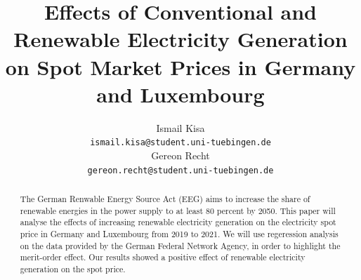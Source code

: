 \documentclass{article}
\title{Effects of Conventional and Renewable Electricity Generation on Spot Market Prices in Germany and Luxembourg}
\author{%
Ismail Kisa\\
\texttt{ismail.kisa@student.uni-tuebingen.de}\\
\And Gereon Recht\\
\texttt{gereon.recht@student.uni-tuebingen.de} \\
}
\begin{document}
\maketitle

\begin{abstract}

The German Renwable Energy Source Act (EEG) aims to increase the share of renewable energies in the power supply to at least 80 percent by 2050. 
This paper will analyse the effects of increasing renewable electricity generation on the electricity spot price in Germany and Luxembourg from 2019 to 2021. 
We will use regeression analysis on the data provided by the German Federal Network Agency, in order to highlight the merit-order effect. 
Our results showed a positive effect of renewable electricity generation on the spot price.



\end{abstract}
\end{document}
